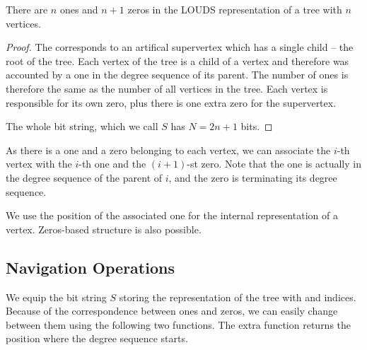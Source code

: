 \begin{lemma}
	There are $n$ ones and $n+1$ zeros in the LOUDS representation of a tree with $n$ vertices.
\end{lemma}
\begin{proof}
	The  corresponds to an artifical supervertex which has a single child -- the root of the tree.
	Each vertex of the tree is a child of a vertex and therefore was accounted by a one in the degree sequence of its parent.
	The number of ones is therefore the same as the number of all vertices in the tree.
	Each vertex is responsible for its own zero, plus there is one extra zero for the supervertex.
	
	The whole bit string, which we call $S$ has $N = 2n + 1$ bits.
\end{proof}

As there is a one and a zero belonging to each vertex, we can associate the $i$-th vertex with the $i$-th one and the $(i+1)$-st zero.
Note that the one is actually in the degree sequence of the parent of $i$, and the zero is terminating its degree sequence.

We use the position of the associated one for the internal representation of a vertex.
Zeros-based structure is also possible. \cite{rahman2006engineering}

\subsection{Navigation Operations}

We equip the bit string $S$ storing the representation of the tree with \rank{} and \select{} indices.
Because of the correspondence between ones and zeros, we can easily change between them using the following two functions.
The extra function \toBeginning{} returns the position where the degree sequence starts.

\begin{algorithm}
\begin{algorithmic}
	\State {}
\EndFunction
\end{algorithmic}
\end{algorithm}

\begin{algorithm}
\begin{algorithmic}
	\State {}
\EndFunction
\end{algorithmic}
\end{algorithm}

